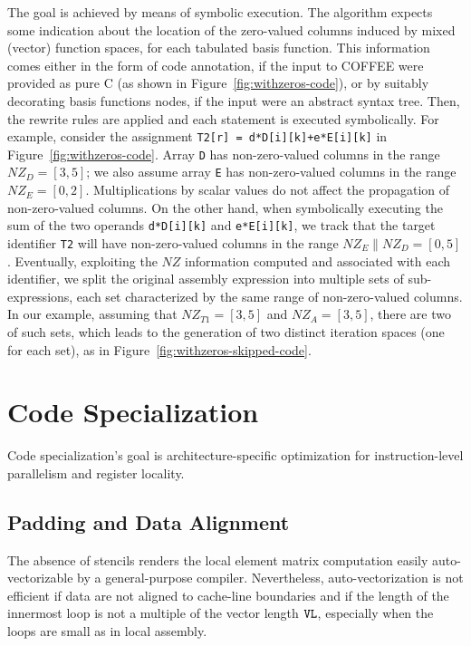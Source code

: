 The goal is achieved by means of symbolic execution. The algorithm expects some indication about the location of the zero-valued columns induced by mixed (vector) function spaces, for each tabulated basis function. This information comes either in the form of code annotation, if the input to COFFEE were provided as pure C (as shown in Figure~\ref{fig:withzeros-code}), or by suitably decorating basis functions nodes, if the input were an abstract syntax tree. Then, the rewrite rules are applied and each statement is executed symbolically. For example, consider the assignment \texttt{T2[r] = d*D[i][k]+e*E[i][k]} in Figure~\ref{fig:withzeros-code}. Array \texttt{D} has non-zero-valued columns in the range $NZ_D=[3,5]$; we also assume array \texttt{E} has non-zero-valued columns in the range $NZ_E=[0,2]$. Multiplications by scalar values do not affect the propagation of non-zero-valued columns. On the other hand, when symbolically executing the sum of the two operands \texttt{d*D[i][k]} and \texttt{e*E[i][k]}, we track that the target identifier \texttt{T2} will have non-zero-valued columns in the range $NZ_E \| NZ_D=[0,5]$. Eventually, exploiting the $NZ$ information computed and associated with each identifier, we split the original assembly expression into multiple sets of sub-expressions, each set characterized by the same range of non-zero-valued columns. In our example, assuming that $NZ_{T1}=[3,5]$ and $NZ_A=[3,5]$, there are two of such sets, which leads to the generation of two distinct iteration spaces (one for each set), as in Figure~\ref{fig:withzeros-skipped-code}.

\section{Code Specialization}
\label{sec:coffee-code-spec}
Code specialization's goal is architecture-specific optimization for instruction-level parallelism and register locality. 

\subsection{Padding and Data Alignment}
\label{sec:coffee-padding}
The absence of stencils renders the local element matrix computation easily auto-vectorizable by a general-purpose compiler. Nevertheless, auto-vectorization is not efficient if data are not aligned to cache-line boundaries and if the length of the innermost loop is not a multiple of the vector length $\mbox{\texttt{VL}}$, especially when the loops are small as in local assembly. 

